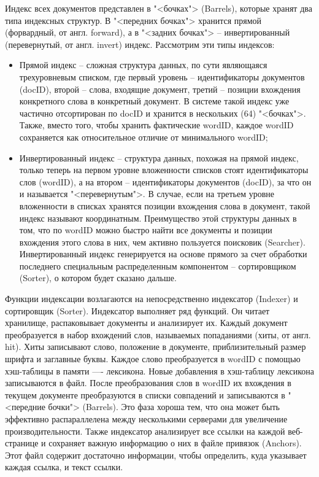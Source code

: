 Индекс всех документов представлен в "<бочках"> (Barrels), которые хранят два типа индексных структур. В "<передних бочках"> хранится прямой (форвардный, от англ. forward), а в "<задних бочках"> -- инвертированный (перевернутый, от англ. invert) индекс. Рассмотрим эти типы индексов:
\begin{itemize}
\item Прямой индекс -- сложная структура данных, по сути являющаяся трехуровневым списком, где первый уровень -- идентификаторы документов (docID), второй -- слова, входящие документ, третий -- позиции вхождения конкретного слова в конкретный документ.
В системе такой индекс уже частично отсортирован по docID и хранится в нескольких (64) "<бочках">. Также, вместо того, чтобы хранить фактические wordID, каждое wordID сохраняется как относительное отличие от минимального wordID;
\item Инвертированный индекс -- структура данных, похожая на прямой индекс, только теперь на первом уровне вложенности списков стоят идентификаторы слов (wordID), а на втором -- идентификаторы документов (docID), за что он и называется "<перевернутым">. В случае, если на третьем уровне вложенности в списках хранятся позиции вхождения слова в документ, такой индекс называют координатным. Преимущество этой структуры данных в том, что по wordID можно быстро найти все документы и позиции вхождения этого слова в них, чем активно пользуется поисковик (Searcher).
Инвертированный индекс генерируется на основе прямого за счет обработки последнего специальным распределенным компонентом -- сортировщиком (Sorter), о котором будет сказано дальше.
\end{itemize}

Функции индексации возлагаются на непосредственно индексатор (Indexer) и сортировщик (Sorter). Индексатор выполняет ряд функций. Он читает хранилище, распаковывает документы и анализирует их. Каждый документ преобразуется в набор вхождений слов, называемых попаданиями (хиты, от англ. hit). Хиты записывают слово, положение в документе, приблизительный размер шрифта и заглавные буквы. Каждое слово преобразуется в wordID с помощью хэш-таблицы в памяти —- лексикона. Новые добавления в хэш-таблицу лексикона записываются в файл. После преобразования слов в wordID их вхождения в текущем документе преобразуются в списки совпадений и записываются в "<передние бочки"> (Barrels). Это фаза хороша тем, что она может быть эффективно распараллелена между несколькими серверами для увеличение производительности. Также индексатор анализирует все ссылки на каждой веб-странице и сохраняет важную информацию о них в файле привязок (Anchors). Этот файл содержит достаточно информации, чтобы определить, куда указывает каждая ссылка, и текст ссылки. 

